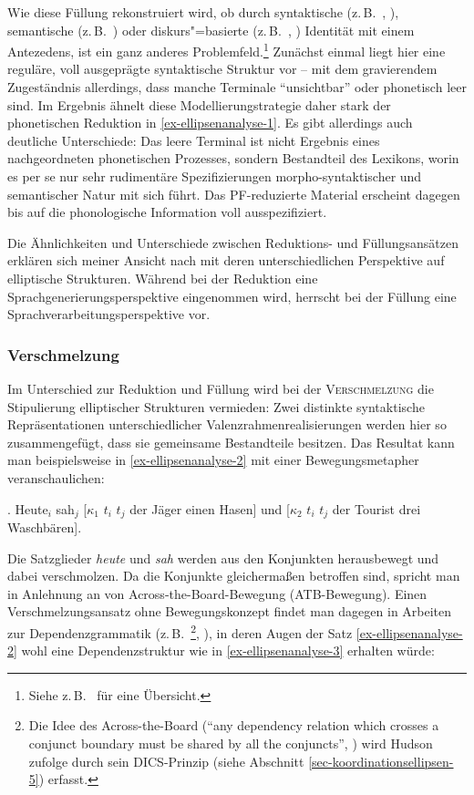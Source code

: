 Wie diese Füllung rekonstruiert wird, ob durch syntaktische (z.\,B.\ \citealt{Fiengo:May:94}, \citealt{Chung:etal:95}), semantische (z.\,B.\ \citealt{Dalrymple:etal:91}) oder diskurs"=basierte (z.\,B.\ \citealt{Hardt:93,Hardt:99}, \citealt{Hardt:Romero:04}) Identität mit einem Antezedens, ist ein ganz anderes Problemfeld.\footnote{Siehe z.\,B.\ \citet[Kapitel~3]{Schlangen:03} für eine Übersicht.} Zunächst einmal liegt hier eine reguläre, voll ausgeprägte syntaktische Struktur vor -- mit dem gravierendem Zugeständnis allerdings, dass manche Terminale "`unsichtbar"' oder phonetisch leer sind. Im Ergebnis ähnelt diese Modellierungstrategie daher stark der phonetischen Reduktion in \ref{ex-ellipsenanalyse-1}. Es gibt allerdings auch deutliche Unterschiede: Das leere Terminal ist nicht Ergebnis eines nachgeordneten phonetischen Prozesses, sondern Bestandteil des Lexikons, worin es per se nur sehr rudimentäre Spezifizierungen morpho-syntaktischer und semantischer Natur mit sich führt. Das PF-reduzierte Material erscheint dagegen bis auf die phonologische Information voll ausspezifiziert. 

Die Ähnlichkeiten und Unterschiede zwischen Reduktions- und Füllungsansätzen erklären sich meiner Ansicht nach mit deren unterschiedlichen Perspektive auf elliptische Strukturen. Während bei der Reduktion eine Sprachgenerierungsperspektive eingenommen wird, herrscht bei der Füllung eine Sprachverarbeitungsperspektive vor.

\subsubsection*{Verschmelzung}

Im Unterschied zur Reduktion und Füllung wird bei der \textsc{Verschmelzung} die Stipulierung elliptischer Strukturen vermieden: Zwei distinkte syntaktische Repräsentationen unterschiedlicher Valenzrahmenrealisierungen werden hier so zusammengefügt, dass sie gemeinsame Bestandteile besitzen. Das Resultat kann man beispielsweise in \ref{ex-ellipsenanalyse-2} mit einer Bewegungsmetapher veranschaulichen: 

\ex. \label{ex-ellipsenanalyse-2} Heute$_i$ sah$_j$ [$\kappa_1$ $t_i$ $t_j$ der Jäger einen Hasen] und [$\kappa_2$ $t_i$ $t_j$ der Tourist drei Waschbären]. 

Die Satzglieder {\it heute} und {\it sah} werden aus den Konjunkten herausbewegt und dabei verschmolzen. Da die Konjunkte gleicherma\ss en betroffen sind, spricht man in Anlehnung an \cite{Williams:78,Williams:81} von Across-the-Board-Bewegung (ATB-Bewegung). Einen Verschmelzungsansatz ohne Bewegungskonzept findet man dagegen in Arbeiten zur Dependenzgrammatik (z.\,B.\ \citealt{Hudson:88}\footnote{Die Idee des Across-the-Board ("`any dependency relation which crosses a conjunct boundary must be shared by all the conjuncts"', \citealt[323]{Hudson:88}) wird Hudson zufolge durch sein DICS-Prinzip (siehe Abschnitt \ref{sec-koordinationsellipsen-5}) erfasst.}, \citealt{Pickering:Barry:93}), in deren Augen der Satz \ref{ex-ellipsenanalyse-2} wohl eine Dependenzstruktur wie in \ref{ex-ellipsenanalyse-3} erhalten würde:

